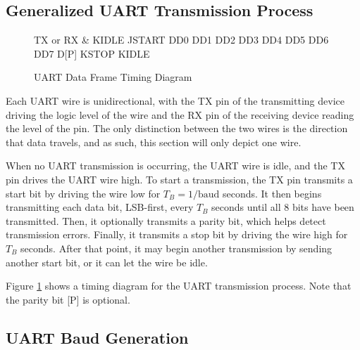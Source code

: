 \subsection{Generalized UART Transmission Process}

\begin{figure}[htpb]
	\begin{tikztimingtable}[timing/font=\rmfamily, timing/d/text/.append style={font=\rmfamily}, xscale=3.5, yscale=2, timing/slope=0.2, timing/dslope=0.2, timing/d/background/.style={fill=white},
		timing/metachar={{K}[2]{#1H !{++(-.5\xunit + 0.5*\slope\xunit, -.5\yunit)} N[rectangle,scale=.6]{#2} !{++(.5\xunit - 0.5*\slope\xunit, +.5\yunit)}}},
		timing/metachar={{J}[2]{#1L !{++(-.5\xunit + 0.5*\slope\xunit, +.5\yunit)} N[rectangle,scale=.6]{#2} !{++(.5\xunit - 0.5*\slope\xunit, -.5\yunit)}}},]
		TX or RX & K{IDLE} J{START} D{D0} D{D1} D{D2} D{D3} D{D4} D{D5} D{D6} D{D7} D{\textrm{[P]}} K{STOP} K{IDLE} \\
	\end{tikztimingtable}
	\caption{UART Data Frame Timing Diagram}
	\label{fig:uart-timing-diagram}
\end{figure}

Each UART wire is unidirectional, with the TX pin of the transmitting device driving the logic level of the wire and the RX pin of the receiving device reading the level of the pin. The only distinction between the two wires is the direction that data travels, and as such, this section will only depict one wire.

When no UART transmission is occurring, the UART wire is idle, and the TX pin drives the UART wire high. To start a transmission, the TX pin transmits a start bit by driving the wire low for $T_B = 1 / \textrm{baud}$ seconds. It then begins transmitting each data bit, LSB-first, every $T_B$ seconds until all 8 bits have been transmitted. Then, it optionally transmits a parity bit, which helps detect transmission errors. Finally, it transmits a stop bit by driving the wire high for $T_B$ seconds. After that point, it may begin another transmission by sending another start bit, or it can let the wire be idle.

Figure \ref{fig:uart-timing-diagram} shows a timing diagram for the UART transmission process. Note that the parity bit [P] is optional.



\subsection{UART Baud Generation}

